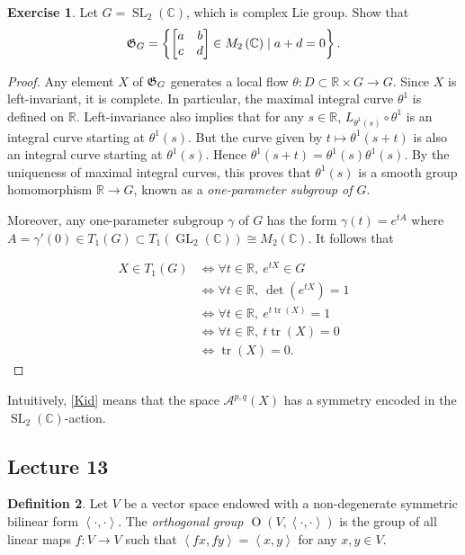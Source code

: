 \documentclass[10pt,letterpaper,cm]{nupset}
\theoremstyle{definition}
\newtheorem{defn}{Definition}[subsection]
\theoremstyle{theorem}
\newtheorem{exercise}[defn]{Exercise}
\theoremstyle{remark}
\newcommand{\A}{\mathcal A}
\newcommand{\C}{\mathbb C}
\newcommand{\G}{\frak{G}}
\newcommand{\R}{\mathbb{R}}
\newcommand{\1}{\mathbb{1}}
\newcommand{\0}{\vec 0}
\DeclareMathOperator{\tr}{tr}
\DeclareMathOperator{\GL}{GL}
\DeclareMathOperator{\SL}{SL}
\DeclareMathOperator{\Or}{O}
\begin{document}
\begin{exercise}
Let $G= \SL_2\left(\C\right)$, which is complex Lie group. Show that $$\G_{G} = \left\{\begin{bmatrix} a & b \\ c & d \end{bmatrix} \in M_2\left(\C\right) \mid a+d =0\right\}.$$
\end{exercise}
\begin{proof}
Any element $X$ of $\G_{G}$ generates a local flow $\theta : D \subset \R \times G \to G$. Since $X$ is left-invariant, it is complete. In particular, the maximal integral curve $\theta^1$ is defined on $\R$.  Left-invariance also implies that for any $s\in \R$, $L_{\theta^1(s)} \circ \theta^1$ is an integral curve starting at $\theta^1(s)$. But the curve given by $t\mapsto \theta^1(s+t)$ is also an integral curve starting at $\theta^1(s)$. Hence $ \theta^1(s+t) = \theta^1(s)\theta^1(s)$. By the uniqueness of maximal integral curves, this proves that $\theta^1(s)$ is a smooth group homomorphism $\R \to G$, known as a \textit{one-parameter subgroup of $G$}. 

\smallskip

Moreover, any one-parameter subgroup $\gamma$ of $G$ has the form  $\gamma(t) = e^{tA}$ where $A = \gamma'(0) \in T_1(G) \subset T_1\left(\GL_2(\C)\right) \cong M_2(\C)$. It follows that 

\begin{align*}
X \in T_1(G)&  \iff \forall{t} \in \R, \  e^{tX} \in G 
\\ & \iff  \forall{t} \in \R, \  \det\left(e^{tX}\right) =1
\\ & \iff  \forall{t} \in \R, \ e^{t\tr(X)} =1
\\ & \iff \forall{t} \in \R, \ t\tr(X) = 0
\\ & \iff \tr(X) =0
. \end{align*}
\end{proof}

Intuitively, \cref{Kid} means that the space $\A^{p,q}\left(X\right)$ has a symmetry encoded in the $\SL_2\left(\C\right)$-action.  

\subsection{Lecture 13}

\begin{defn}
Let $V$ be a vector space endowed with a non-degenerate symmetric bilinear form $\left\langle \cdot , \cdot \right\rangle$. The \textit{orthogonal group $\Or\left(V, \left\langle \cdot , \cdot \right\rangle\right)$} is the group of all linear maps $f : V \to V$ such that $\left\langle f{x}, f{y}\right\rangle = \left\langle x,y\right\rangle$ for any $x,y\in V$.
\end{defn}
\end{document}
